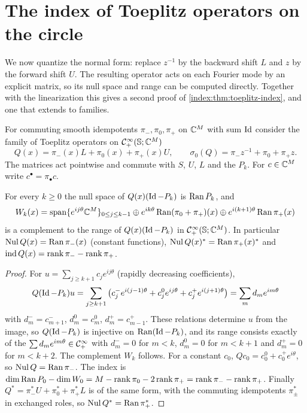 \section{The index of Toeplitz operators on the circle}\label{bott:sec:circle}

We now quantize the normal form: replace $z^{-1}$ by the backward shift $L$ and
$z$ by the forward shift $U$. The resulting operator acts on each Fourier mode by
an explicit matrix, so its null space and range can be computed directly. Together
with the linearization this gives a second proof of
\cref{index:thm:toeplitz-index}, and one that extends to families.

For commuting smooth idempotents $\pi_-,\pi_0,\pi_+$ on $\mathbb{C}^M$ with sum $\operatorname{Id}$
consider the family of Toeplitz operators on $\mathcal{C}^\infty_+(\mathbb{S};\mathbb{C}^M)$
\begin{equation}\label{bott:eq:normal-op}
  Q(x)=\pi_-(x)L+\pi_0(x)+\pi_+(x)U,\qquad
  \sigma_0(Q)=\pi_-z^{-1}+\pi_0+\pi_+z.
\end{equation}
The matrices act pointwise and commute with $S$, $U$, $L$ and the $P_k$. For
$c\in\mathbb{C}^M$ write $c^\bullet=\pi_\bullet c$.

\begin{lemma}\label{bott:lem:normal-op}
  For every $k\ge0$ the null space of $Q(x)(\operatorname{Id}-P_k)$ is $\operatorname{Ran} P_k$, and
  \begin{equation*}
    W_k(x)=\operatorname{span}\{e^{ij\theta}\mathbb{C}^M\}_{0\le j\le k-1}
    \oplus e^{ik\theta}\operatorname{Ran}(\pi_0+\pi_+)(x)\oplus e^{i(k+1)\theta}\operatorname{Ran}\pi_+(x)
  \end{equation*}
  is a complement to the range of $Q(x)(\operatorname{Id}-P_k)$ in $\mathcal{C}^\infty_+(\mathbb{S};\mathbb{C}^M)$. In
  particular $\operatorname{Nul} Q(x)=\operatorname{Ran}\pi_-(x)$ (constant functions),
  $\operatorname{Nul} Q(x)^*=\operatorname{Ran}\pi_+(x)^*$ and $\operatorname{ind} Q(x)=\operatorname{rank}\pi_--\operatorname{rank}\pi_+$.
\end{lemma}
\begin{proof}
  For $u=\sum_{j\ge k+1}c_je^{ij\theta}$ (rapidly decreasing coefficients),
  \begin{equation*}
    Q(\operatorname{Id}-P_k)u=\sum_{j\ge k+1}\big(c_j^-e^{i(j-1)\theta}+c_j^0e^{ij\theta}+c_j^+e^{i(j+1)\theta}\big)
    =\sum_md_me^{im\theta}
  \end{equation*}
  with $d^-_m=c^-_{m+1}$, $d^0_m=c^0_m$, $d^+_m=c^+_{m-1}$. These relations determine $u$
  from the image, so $Q(\operatorname{Id}-P_k)$ is injective on $\operatorname{Ran}(\operatorname{Id}-P_k)$, and its range
  consists exactly of the $\sum d_me^{im\theta}\in\mathcal{C}^\infty_+$ with $d^-_m=0$ for $m<k$,
  $d^0_m=0$ for $m<k+1$ and $d^+_m=0$ for $m<k+2$. The complement $W_k$ follows. For
  a constant $c_0$, $Qc_0=c_0^0+c_0^+e^{i\theta}$, so $\operatorname{Nul} Q=\operatorname{Ran}\pi_-$. The
  index is $\dim\operatorname{Ran} P_0-\dim W_0=M-\operatorname{rank}\pi_0-2\operatorname{rank}\pi_+=\operatorname{rank}\pi_--\operatorname{rank}\pi_+$.
  Finally $Q^*=\pi_-^*U+\pi_0^*+\pi_+^*L$ is of the same form, with the commuting
  idempotents $\pi_\pm^*$ in exchanged roles, so $\operatorname{Nul} Q^*=\operatorname{Ran}\pi_+^*$.
\end{proof}

